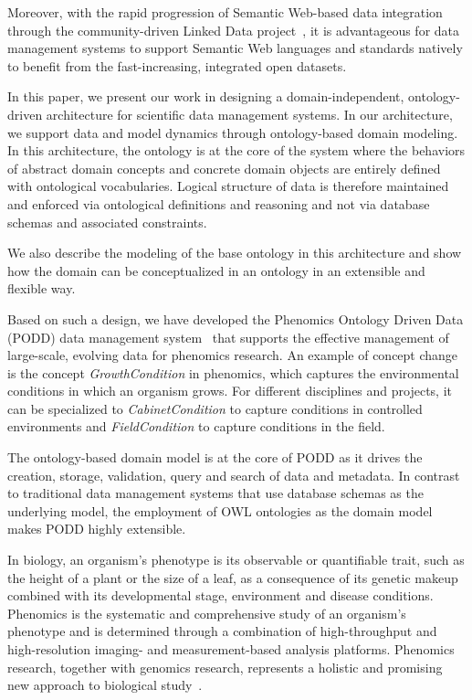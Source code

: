 \documentclass{elsarticle}
\begin{document}
Moreover, with the rapid progression of Semantic Web-based
data integration through the community-driven Linked Data
project~\cite{citeulike:5008761},
it is advantageous for data management systems to support
Semantic Web languages and standards natively to benefit
from the fast-increasing, integrated open datasets.

In this paper, we present our work in designing
a domain-independent, ontology-driven architecture for scientific
data management systems. In our architecture, we support data and model
dynamics through ontology-based domain modeling. In this architecture,
the ontology is at the core of the system where the behaviors of
abstract domain concepts and concrete domain objects are entirely
defined with ontological vocabularies. Logical structure of
data is therefore maintained and enforced via ontological
definitions and reasoning and not via database schemas and associated
constraints.

We also describe the modeling of the base ontology in
this architecture and show how the domain can be
conceptualized in an ontology in an extensible and
flexible way.

Based on such a design, we have developed the Phenomics Ontology
Driven Data (PODD) data management system~\cite{podd_icadl} that
supports the effective management of large-scale, evolving data for
phenomics research. An example of concept change is the concept
\emph{GrowthCondition} in phenomics, which captures the
environmental conditions in which an organism grows. For different
disciplines and projects, it can be specialized to
\emph{CabinetCondition} to capture conditions in controlled
environments and \emph{FieldCondition} to capture conditions in the
field.

The ontology-based domain model is at the core of PODD as it drives
the creation, storage, validation, query and search of data and
metadata. In contrast to traditional data management systems that
use database schemas as the underlying model, the employment of OWL
ontologies as the domain model makes PODD highly extensible.

In biology, an organism's phenotype is its observable or
quantifiable trait, such as the height of a plant or the size of a
leaf, as a consequence of its genetic makeup combined with its
developmental stage, environment and disease conditions. Phenomics
is the systematic and comprehensive study of an organism's phenotype
and is determined through a combination of high-throughput and
high-resolution imaging- and measurement-based analysis platforms.
Phenomics research, together with genomics research, represents a
holistic and promising new approach to biological
study~\cite{dhoule09,Sauer200458,nevo01,plant_furbank}.
\end{document}
